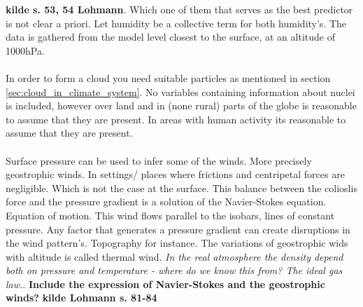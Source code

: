 \textbf{kilde s. 53, 54 Lohmann}. Which one of them that serves as the best predictor is not clear a priori. Let humidity be a collective term for both humidity's. The data is gathered from the model level closest to the surface, at an altitude of 1000hPa. 
\\ \\ 
In order to form a cloud you need suitable particles as mentioned in section \ref{sec:cloud_in_climate_system}. No variables containing information about nuclei is included, however over land and in (none rural) parts of the globe is reasonable to assume that they are present. In areas with human activity its reasonable to assume that they are present.
\\ \\
Surface pressure can be used to infer some of the winds. More precisely geostrophic winds. In settings/ places where frictions and centripetal forces are negligible. Which is not the case at the surface. This balance between the colioslis force and the pressure gradient is a solution of the Navier-Stokes equation. Equation of motion. This wind flows parallel to the isobars, lines of constant pressure. Any factor that generates a pressure gradient can create disruptions in the wind pattern's. Topography for instance. The variations of geostrophic wids with altitude is called thermal wind. \textit{In the real atmosphere the density depend both on pressure and temperature - where do we know this from? The ideal gas law.}. \textbf{Include the expression of Navier-Stokes and the geostrophic winds?}
\textbf{kilde Lohmann s. 81-84}
\\ \\ 
